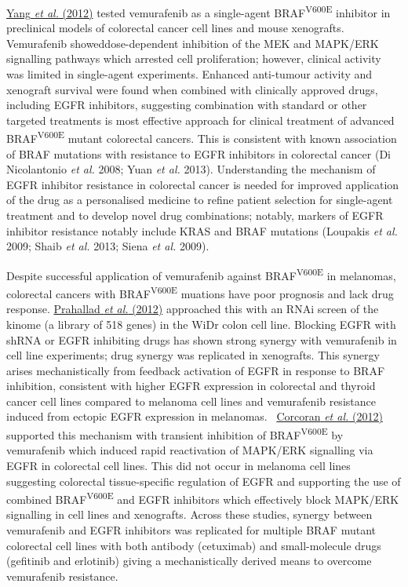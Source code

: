\hyperlink{ENREF115}{Yang}\hyperlink{ENREF115}{\textit{ et
al.}}\hyperlink{ENREF115}{ (2012)} tested vemurafenib as a single-agent
BRAF\textsuperscript{V600E} inhibitor in preclinical models of
colorectal cancer cell lines and mouse xenografts. Vemurafenib
showeddose-dependent inhibition of the MEK and MAPK/ERK signalling
pathways which arrested cell proliferation; however, clinical activity
was limited in single-agent experiments. Enhanced anti-tumour
activity and xenograft survival were found when combined with
clinically approved drugs, including EGFR inhibitors, suggesting
combination with standard or other targeted treatments is most
effective approach for clinical treatment of advanced
BRAF\textsuperscript{V600E} mutant colorectal cancers. This is
consistent with known association of BRAF mutations with resistance to
EGFR inhibitors in colorectal cancer (Di Nicolantonio\textit{ et al.}
2008; Yuan\textit{ et al.} 2013). Understanding the mechanism of EGFR
inhibitor resistance in colorectal cancer is needed for improved
application of the drug as a personalised medicine to refine patient
selection for single-agent treatment and to develop novel drug
combinations; notably, markers of EGFR inhibitor resistance notably
include KRAS and BRAF mutations (Loupakis\textit{ et al.} 2009;
Shaib\textit{ et al.} 2013; Siena\textit{ et al.} 2009). 


Despite successful application of vemurafenib against
BRAF\textsuperscript{V600E} in melanomas, colorectal cancers with
BRAF\textsuperscript{V600E} muations have poor prognosis and lack drug
response. \hyperlink{ENREF80}{Prahallad}\hyperlink{ENREF80}{\textit{
et al.}}\hyperlink{ENREF80}{ (2012)} approached this with an RNAi
screen of the kinome (a library of 518 genes) in the WiDr colon cell
line. Blocking EGFR with shRNA or EGFR inhibiting drugs has shown
strong synergy with vemurafenib in cell line experiments; drug synergy
was replicated in xenografts. This synergy arises mechanistically
from feedback activation of EGFR in response to BRAF inhibition,
consistent with higher EGFR expression in colorectal and thyroid cancer
cell lines compared to melanoma cell lines and vemurafenib resistance
induced from ectopic EGFR expression in melanomas.
\ \hyperlink{ENREF24}{Corcoran}\hyperlink{ENREF24}{\textit{ et
al.}}\hyperlink{ENREF24}{ (2012)} supported this mechanism with
transient inhibition of BRAF\textsuperscript{V600E} by vemurafenib
which induced rapid reactivation of MAPK/ERK signalling via EGFR in
colorectal cell lines. This did not occur in melanoma cell lines
suggesting colorectal tissue-specific regulation of EGFR and supporting
the use of combined BRAF\textsuperscript{V600E} and EGFR inhibitors
which effectively block MAPK/ERK signalling in cell lines and
xenografts. Across these studies, synergy between vemurafenib and
EGFR inhibitors was replicated for multiple BRAF mutant colorectal cell
lines with both antibody (cetuximab) and small-molecule drugs
(gefitinib and erlotinib) giving a mechanistically derived means to
overcome vemurafenib resistance. 


